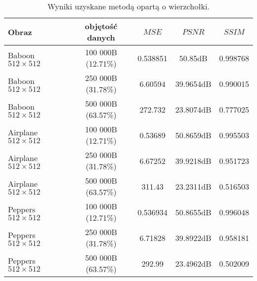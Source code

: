 {    \begin{table}
        \centering
        \begin{tabular}{ |l|c|c c c| }
            \hline
            Obraz & objętość danych & $MSE$ & $PSNR$ & $SSIM$ \\
            \hline
            Baboon {\footnotesize $512 \times 512$}   & 100 000B (12.71\%) & 0.538851 & 50.85dB & 0.998768 \\
            Baboon {\footnotesize $512 \times 512$}   & 250 000B (31.78\%) & 6.60594 & 39.9654dB & 0.990015 \\
            Baboon {\footnotesize $512 \times 512$}   & 500 000B (63.57\%) & 272.732 & 23.8074dB & 0.777025 \\
            Airplane {\footnotesize $512 \times 512$} & 100 000B (12.71\%) & 0.53689 & 50.8659dB & 0.995503 \\
            Airplane {\footnotesize $512 \times 512$} & 250 000B (31.78\%) & 6.67252 & 39.9218dB & 0.951723 \\
            Airplane {\footnotesize $512 \times 512$} & 500 000B (63.57\%) & 311.43 & 23.2311dB & 0.516503 \\
            Peppers {\footnotesize $512 \times 512$}  & 100 000B (12.71\%) & 0.536934 & 50.8655dB & 0.996048 \\
            Peppers {\footnotesize $512 \times 512$}  & 250 000B (31.78\%) & 6.71828 & 39.8922dB & 0.958181 \\
            Peppers {\footnotesize $512 \times 512$}  & 500 000B (63.57\%) & 292.99 & 23.4962dB & 0.502009 \\
            \hline
        \end{tabular}
        \caption{Wyniki uzyskane metodą opartą o wierzchołki.}
        \label{tab:exp-vertex-results}
    \end{table}

}
